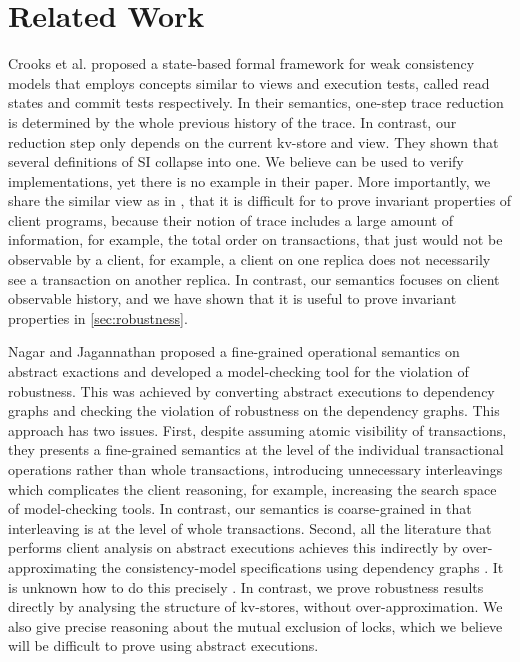 \section{Related Work} 
\label{sec:related}
Crooks et al. \citet{seebelieve} proposed
a state-based formal framework for weak consistency models 
that employs concepts  similar to views and execution tests, called
read states and commit tests  respectively.
In their semantics, one-step trace reduction is determined by the whole previous history of the trace. 
In contrast, our reduction step only depends on the current kv-store and view.
They shown that several definitions of SI collapse into one.
We believe \citet{seebelieve} can be used to verify implementations,
yet there is no example in their paper.
More importantly,
we share the similar view as in \cite{sureshConcur},
that it is difficult for \citet{seebelieve} to prove invariant properties of client programs,
because their notion of trace includes a large amount of
information, for example, the total order on transactions,
that just would not be observable by a client, 
for example, a client on one replica does not necessarily see a transaction on another replica.
In contrast, our semantics focuses on client observable history, and
we have shown that it is useful to prove invariant properties in \cref{sec:robustness}.

Nagar and Jagannathan \cite{sureshConcur} proposed a fine-grained operational semantics on abstract exactions 
and developed a model-checking tool for the violation of robustness. 
This was achieved by converting abstract executions to
dependency graphs and checking the violation of robustness on the
dependency graphs. This approach has two issues. First, despite 
assuming atomic visibility of transactions, they presents a fine-grained
semantics at the level of the individual transactional operations
rather than whole transactions, introducing unnecessary interleavings
which complicates the client reasoning, for example, increasing the
search space of model-checking tools. 
In contrast, our semantics is coarse-grained in that interleaving is at the level of whole
transactions. 
Second, all the literature that performs client analysis
on abstract executions achieves this indirectly by over-approximating
the consistency-model specifications using dependency graphs
\cite{giovanni_concur16,SIanalysis,psi-chopping,laws,sureshConcur}. 
It is  unknown how to do this precisely \cite{laws}. 
In contrast, we prove robustness results directly by
analysing the structure of kv-stores, without over-approximation. 
We also give precise reasoning about the mutual exclusion of locks,
which we believe will be difficult to prove using abstract executions.

